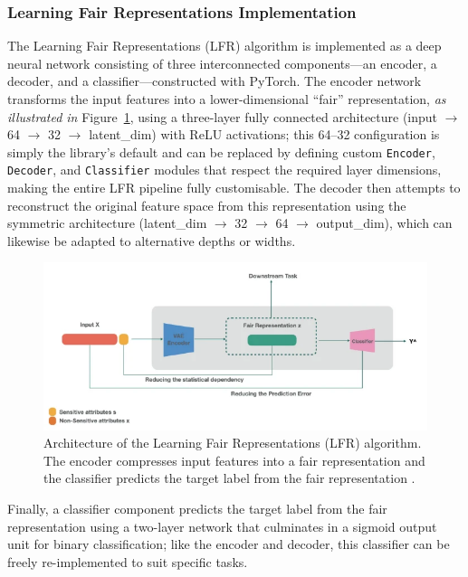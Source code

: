 \documentclass[12pt,a4paper,openright,twoside]{book}
\begin{document}
\subsubsection{Learning Fair Representations Implementation}
The Learning Fair Representations (LFR) algorithm is implemented as a deep neural network consisting of three interconnected components—an encoder, a decoder, and a classifier—constructed with PyTorch. The encoder network transforms the input features into a lower-dimensional “fair” representation, \textit{as illustrated in} Figure~\ref{fig:lfr_architecture}, using a three-layer fully connected architecture (input $\rightarrow$ 64 $\rightarrow$ 32 $\rightarrow$ latent\_dim) with ReLU activations; this 64–32 configuration is simply the library’s default and can be replaced by defining custom \texttt{Encoder}, \texttt{Decoder}, and \texttt{Classifier} modules that respect the required layer dimensions, making the entire LFR pipeline fully customisable. The decoder then attempts to reconstruct the original feature space from this representation using the symmetric architecture (latent\_dim $\rightarrow$ 32 $\rightarrow$ 64 $\rightarrow$ output\_dim), which can likewise be adapted to alternative depths or widths. 

\begin{figure}
\centering
\includegraphics[width=\textwidth]{figures/lfr_architecture.png}
\caption{Architecture of the Learning Fair Representations (LFR) algorithm. The encoder compresses input features into a fair representation and the classifier predicts the target label from the fair representation \cite{TayebiAidaLfr}.}
\label{fig:lfr_architecture}
\end{figure}

Finally, a classifier component predicts the target label from the fair representation using a two-layer network that culminates in a sigmoid output unit for binary classification; like the encoder and decoder, this classifier can be freely re-implemented to suit specific tasks.
\end{document}
